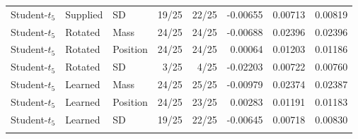 \begin{tabular}{@{}lllrrrrr@{}}
Student-$t_5$ & Supplied & SD & 19/25 & 22/25 & -0.00655 & 0.00713 & 0.00819 \\
\addlinespace[3pt]
Student-$t_5$ & Rotated & Mass & 24/25 & 24/25 & -0.00688 & 0.02396 & 0.02396 \\
Student-$t_5$ & Rotated & Position & 24/25 & 24/25 & 0.00064 & 0.01203 & 0.01186 \\
Student-$t_5$ & Rotated & SD & 3/25 & 4/25 & -0.02203 & 0.00722 & 0.00760 \\
\addlinespace[3pt]
Student-$t_5$ & Learned & Mass & 24/25 & 25/25 & -0.00979 & 0.02374 & 0.02387 \\
Student-$t_5$ & Learned & Position & 24/25 & 23/25 & 0.00283 & 0.01191 & 0.01183 \\
Student-$t_5$ & Learned & SD & 19/25 & 22/25 & -0.00645 & 0.00718 & 0.00830 \\
\addlinespace[3pt]
\bottomrule
\end{tabular}
